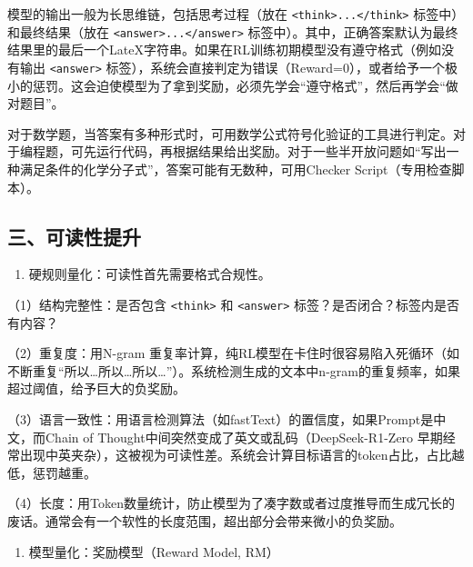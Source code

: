 模型的输出一般为长思维链，包括思考过程（放在 \texttt{\textless{}think\textgreater{}...\textless{}/think\textgreater{}} 标签中）和最终结果（放在 \texttt{\textless{}answer\textgreater{}...\textless{}/answer\textgreater{}} 标签中）。其中，正确答案默认为最终结果里的最后一个LateX字符串。如果在RL训练初期模型没有遵守格式（例如没有输出 \texttt{\textless{}answer\textgreater{}} 标签），系统会直接判定为错误（Reward=0），或者给予一个极小的惩罚。这会迫使模型为了拿到奖励，必须先学会``遵守格式''，然后再学会``做对题目''。

对于数学题，当答案有多种形式时，可用数学公式符号化验证的工具进行判定。对于编程题，可先运行代码，再根据结果给出奖励。对于一些半开放问题如``写出一种满足条件的化学分子式''，答案可能有无数种，可用Checker Script（专用检查脚本）。

\hypertarget{ux4e09ux53efux8bfbux6027ux63d0ux5347}{%
\subsection{三、可读性提升}\label{ux4e09ux53efux8bfbux6027ux63d0ux5347}}

\begin{enumerate}
\def\labelenumi{\arabic{enumi}.}
\tightlist
\item
  硬规则量化：可读性首先需要格式合规性。
\end{enumerate}

（1）结构完整性：是否包含 \texttt{\textless{}think\textgreater{}} 和 \texttt{\textless{}answer\textgreater{}} 标签？是否闭合？标签内是否有内容？

（2）重复度：用N-gram 重复率计算，纯RL模型在卡住时很容易陷入死循环（如不断重复``所以\ldots 所以\ldots 所以\ldots{}''）。系统检测生成的文本中n-gram的重复频率，如果超过阈值，给予巨大的负奖励。

（3）语言一致性：用语言检测算法（如fastText）的置信度，如果Prompt是中文，而Chain of Thought中间突然变成了英文或乱码（DeepSeek-R1-Zero 早期经常出现中英夹杂），这被视为可读性差。系统会计算目标语言的token占比，占比越低，惩罚越重。

（4）长度：用Token数量统计，防止模型为了凑字数或者过度推导而生成冗长的废话。通常会有一个软性的长度范围，超出部分会带来微小的负奖励。

\begin{enumerate}
\def\labelenumi{\arabic{enumi}.}
\setcounter{enumi}{1}
\tightlist
\item
  模型量化：奖励模型（Reward Model, RM）
\end{enumerate}

